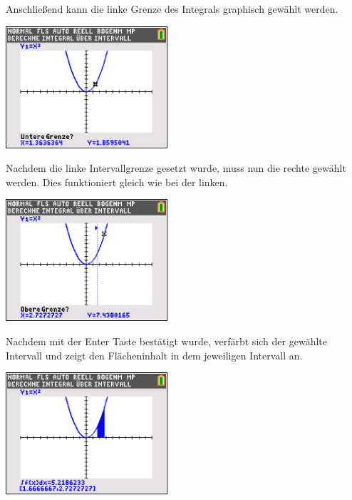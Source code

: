 \begin{paracol}{2}
\begin{flushleft}
	Anschließend kann die linke Grenze des Integrals graphisch gewählt werden.
\end{flushleft}	
\switchcolumn
\begin{flushright}
	\includegraphics[width=6cm]{Media/GRT/Visualisierung/Integrale_berechnen/Integrale_berechnen_2.png}
\end{flushright}
\end{paracol}

\begin{paracol}{2}
\begin{flushleft}
	Nachdem die linke Intervallgrenze gesetzt wurde, muss nun die rechte gewählt werden. Dies funktioniert gleich wie bei der linken.
\end{flushleft}	
\switchcolumn
\begin{flushright}
	\includegraphics[width=6cm]{Media/GRT/Visualisierung/Integrale_berechnen/Integrale_berechnen_3.png}
\end{flushright}
\end{paracol}

\begin{paracol}{2}
\begin{flushleft}
	Nachdem mit der Enter Taste bestätigt wurde, verfärbt sich der gewählte Intervall und zeigt den Flächeninhalt in dem jeweiligen Intervall an. 
\end{flushleft}
\switchcolumn
\begin{flushright}
	\includegraphics[width=6cm]{Media/GRT/Visualisierung/Integrale_berechnen/Integrale_berechnen_4.png}
\end{flushright}
\end{paracol}
\pagebreak
